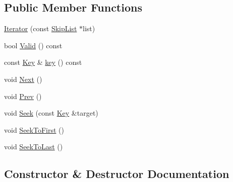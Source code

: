 \subsection*{Public Member Functions}
\begin{DoxyCompactItemize}
\item 
\mbox{\hyperlink{classleveldb_1_1_skip_list_1_1_iterator_ab27d6dd0959d67ed26f2bd451c18270c}{Iterator}} (const \mbox{\hyperlink{classleveldb_1_1_skip_list}{Skip\+List}} $\ast$list)
\item 
bool \mbox{\hyperlink{classleveldb_1_1_skip_list_1_1_iterator_a6eaf87cf7b2a58908ea3d8f9cccc606f}{Valid}} () const
\item 
const \mbox{\hyperlink{namespaceleveldb_a7e9a9725b13fa0bd922d885280dfab95}{Key}} \& \mbox{\hyperlink{classleveldb_1_1_skip_list_1_1_iterator_a8b9bc9940fbf067a3fb500ebae6999be}{key}} () const
\item 
void \mbox{\hyperlink{classleveldb_1_1_skip_list_1_1_iterator_ade5a684c74056f578f85237735da0cef}{Next}} ()
\item 
void \mbox{\hyperlink{classleveldb_1_1_skip_list_1_1_iterator_a10dbaf45640ab2b9f61a96c82e7227e5}{Prev}} ()
\item 
void \mbox{\hyperlink{classleveldb_1_1_skip_list_1_1_iterator_a6c641d5cd37386abdb0aa8d73454611a}{Seek}} (const \mbox{\hyperlink{namespaceleveldb_a7e9a9725b13fa0bd922d885280dfab95}{Key}} \&target)
\item 
void \mbox{\hyperlink{classleveldb_1_1_skip_list_1_1_iterator_adf69c04f0480a66f10a125c49e19caa7}{Seek\+To\+First}} ()
\item 
void \mbox{\hyperlink{classleveldb_1_1_skip_list_1_1_iterator_afe892ff436137b85216c2ed124f3c6dd}{Seek\+To\+Last}} ()
\end{DoxyCompactItemize}


\subsection{Constructor \& Destructor Documentation}
\mbox{\label{classleveldb_1_1_skip_list_1_1_iterator_ab27d6dd0959d67ed26f2bd451c18270c}} 
